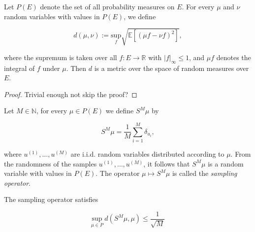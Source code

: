 \begin{lemma}
  Let $P(E)$ denote the set of all probability measures on $E$. For every $\mu$ and $\nu$ random variables with values in $P(E)$, we define

  \begin{equation*}
    d(\mu, \nu) := \underset{f}{\text{sup}} \sqrt{\mathbb{E}\left[(\mu f - \nu f)^2\right]},
  \end{equation*}

  where the supremum is taken over all $f : E \rightarrow \mathbb{R}$ with $|f|_\infty \le 1$, and $\mu f$ denotes the integral of $f$ under $\mu$. Then $d$ is a metric over the space of random measures over $E$.
\end{lemma}

\begin{proof} Trivial enough not skip the proof?
\end{proof}

\begin{definition}
  Let $M \in \mathbb{N}$, for every $\mu \in P(E)$ we define $S^M\mu$ by

  \begin{equation*}
    S^M\mu = \frac1{M}\sum_{i=1}^M\delta_{u_i},
  \end{equation*}

  where $u^{(1)}, \ldots, u^{(M)}$ are i.i.d. random variables distributed according to $\mu$. From the randomness of the samples $u^{(1)}, \ldots, u^{(M)}$, it follows that $S^M\mu$ is a random variable with values in $P(E)$. The operator $\mu \mapsto S^M\mu$ is called the \textit{sampling operator}.
\end{definition}


\begin{lemma}\label{sampling_bound}
  The sampling operator satisfies

  \begin{equation*}
    \underset{\mu \in P}{\text{sup}}\ d(S^M\mu, \mu) \le \frac1{\sqrt{M}}
  \end{equation*}
\end{lemma}


